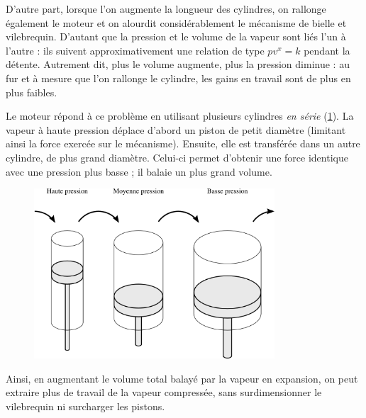 	D’autre part, lorsque l’on augmente la longueur des cylindres, on rallonge également le moteur et on alourdit considérablement le mécanisme de bielle et vile\-brequin. D’autant que la pression et le volume de la vapeur sont liés l’un à l’autre : ils suivent approximativement une relation de type $p v^{x} = k$ pendant la détente. Autrement dit, plus le volume augmente, plus la pression diminue : au fur et à mesure que l’on rallonge le cylindre, les gains en travail sont de plus en plus faibles.

	Le moteur  répond à ce problème en utilisant plusieurs cylindres \textit{en série} (\cref{fig_cylindres_compound}). La vapeur à haute pression déplace d’abord un piston de petit diamètre (limitant ainsi la force exercée sur le mécanisme). Ensuite, elle est transférée dans un autre cylindre, de plus grand diamètre. Celui-ci permet d’obtenir une force identique avec une pression plus basse ; il balaie un plus grand volume.

	\begin{figure}
		\begin{center}
			\includegraphics[width=0.8\textwidth]{images/cylindres_compound.png}
			\onlyamphibook{\vspace{-1cm}}%
		\end{center}
		\label{fig_cylindres_compound}
			\onlyamphibook{\vspace{-1em}}%
	\end{figure}

	Ainsi, en augmentant le volume total balayé par la vapeur en expansion, on peut extraire plus de travail de la vapeur compressée, sans surdimensionner le vilebrequin ni surcharger les pistons.

